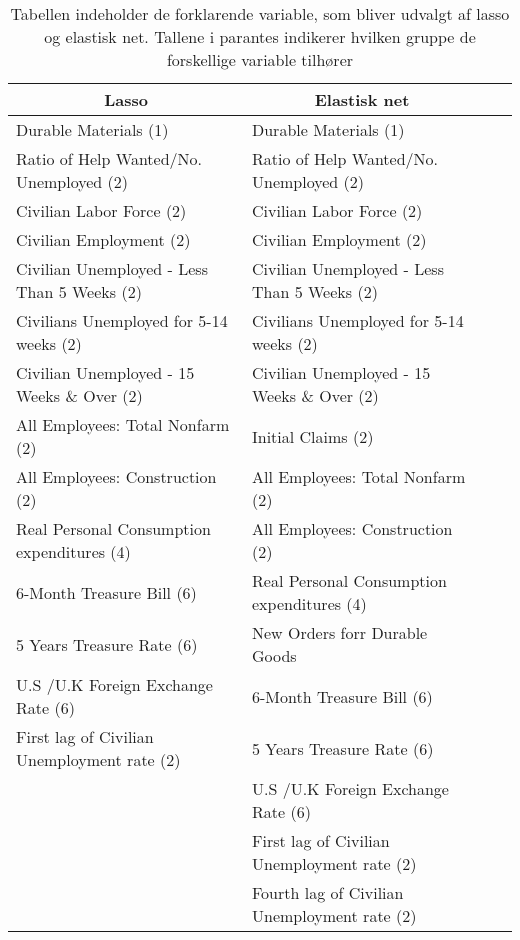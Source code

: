  \begin{table}
\small
\center
\begin{tabular}{lllc}
\toprule
\multicolumn{1}{c}{Lasso} & \multicolumn{1}{c}{Elastisk net} \\ \midrule
Durable Materials (1)   &Durable Materials (1)    \\
Ratio of Help Wanted/No. Unemployed (2) &  Ratio of Help Wanted/No. Unemployed (2) \\
Civilian Labor Force (2) & Civilian Labor Force (2)  \\
Civilian Employment  (2) & Civilian Employment  (2)  \\
Civilian Unemployed - Less Than 5 Weeks (2) & Civilian Unemployed - Less Than 5 Weeks (2)  \\
Civilians Unemployed for 5-14 weeks (2) &Civilians Unemployed for 5-14 weeks (2)    \\
Civilian Unemployed - 15 Weeks \& Over (2) & Civilian Unemployed - 15 Weeks \& Over (2)  \\
All Employees: Total Nonfarm (2) & Initial Claims (2)  \\
All Employees: Construction (2) & All Employees: Total Nonfarm (2) \\
Real Personal Consumption expenditures (4) &  All Employees: Construction (2) \\
6-Month Treasure Bill (6) & Real Personal Consumption expenditures (4)  \\
5 Years Treasure Rate (6) & New Orders forr Durable Goods  \\
U.S /U.K Foreign Exchange Rate  (6) & 6-Month Treasure Bill (6)   \\
First lag of Civilian Unemployment rate (2) &  5 Years Treasure Rate (6)\\
& U.S /U.K Foreign Exchange Rate  (6)  \\ 
&  First lag of Civilian Unemployment rate (2) \\
&  Fourth lag of Civilian Unemployment rate (2)  \\\bottomrule 
\end{tabular}
\caption{Tabellen indeholder de forklarende variable, som bliver udvalgt af lasso og elastisk net. Tallene i parantes indikerer hvilken gruppe de forskellige variable tilhører} \label{tab: lasso_ud}
\end{table}
